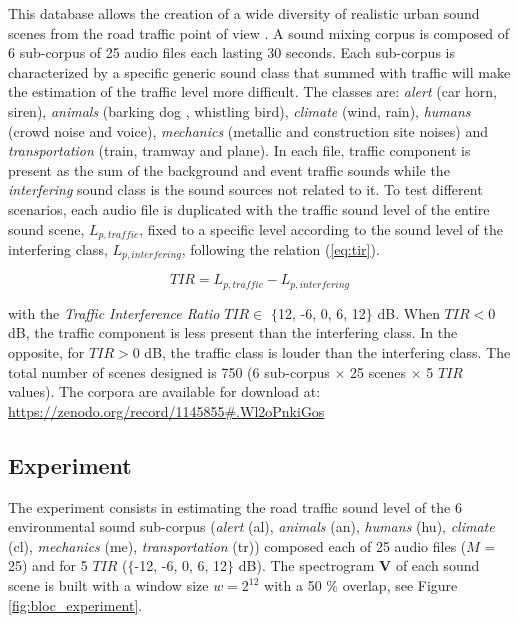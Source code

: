 \documentclass[twocolumn]{svjour3}          %
\begin{document}
This database allows the creation of a wide diversity of realistic urban sound scenes from the road traffic point of view \cite{gloaguen_creation_2017}. A sound mixing corpus is composed of 6 sub-corpus of 25 audio files each lasting 30 seconds. Each sub-corpus is characterized by a specific generic sound class that summed with traffic will make the estimation of the traffic level more difficult. The classes are: \textit{alert} (car horn, siren), \textit{animals} (barking dog , whistling bird), \textit{climate} (wind, rain), \textit{humans} (crowd noise and voice), \textit{mechanics} (metallic and construction site noises) and \textit{transportation} (train, tramway and plane). In each file, traffic component is present as the sum of the background and event traffic sounds while the \textit{interfering} sound class is the sound sources not related to it. To test different scenarios, each audio file is duplicated with the traffic sound level of the entire sound scene, $L_{p,traffic}$, fixed to a specific level according to the sound level of the interfering class, $L_{p,interfering}$,  following the relation (\ref{eq:tir}).

\begin{equation}\label{eq:tir}
TIR = L_{p,traffic}-L_{p,interfering}
\end{equation}

with the \textit{Traffic Interference Ratio} $TIR \in$ $\lbrace$12, -6, 0, 6, 12$\rbrace$ dB. When $TIR < 0$ dB, the traffic component is less present than the interfering class. In the opposite, for $TIR > 0$ dB, the traffic class is louder than the interfering class. The total number of scenes designed is 750 (6 sub-corpus $\times$ 25 scenes $\times$  5 $TIR$ values). The corpora are available for download at: \url{https://zenodo.org/record/1145855#.Wl2oPnkiGos}

\subsection{Experiment}

The experiment consists in estimating the road traffic sound level of the 6 environmental sound sub-corpus (\textit{alert} (al), \textit{animals} (an), \textit{humans} (hu), \textit{climate} (cl), \textit{mechanics} (me), \textit{transportation} (tr)) composed each of 25 audio files ($M$ = 25) and for 5 $TIR$ ($\lbrace$-12, -6, 0, 6, 12$\rbrace$ dB). The spectrogram $\mathbf{V}$ of each sound scene is built with a window size $w = 2^{12}$ with a 50 $\%$ overlap, see Figure \ref{fig:bloc_experiment}.
\end{document}

